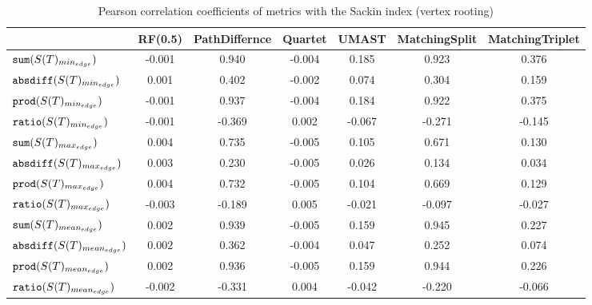 \begin{table}[h]
\centering
\caption{Pearson correlation coefficients of metrics with the Sackin index (vertex rooting)}
\begin{tabular}{lcccccc}
 & RF(0.5) & PathDiffernce & Quartet & UMAST & MatchingSplit & MatchingTriplet \\
\hline
${\verb+sum+}(S(T)_{min_{edge}})$ & -0.001 & 0.940 & -0.004 & 0.185 & 0.923 & 0.376 \\
${\verb+absdiff+}(S(T)_{min_{edge}})$ & 0.001 & 0.402 & -0.002 & 0.074 & 0.304 & 0.159 \\
${\verb+prod+}(S(T)_{min_{edge}})$ & -0.001 & 0.937 & -0.004 & 0.184 & 0.922 & 0.375 \\
${\verb+ratio+}(S(T)_{min_{edge}})$ & -0.001 & -0.369 & 0.002 & -0.067 & -0.271 & -0.145 \\
${\verb+sum+}(S(T)_{max_{edge}})$ & 0.004 & 0.735 & -0.005 & 0.105 & 0.671 & 0.130 \\
${\verb+absdiff+}(S(T)_{max_{edge}})$ & 0.003 & 0.230 & -0.005 & 0.026 & 0.134 & 0.034 \\
${\verb+prod+}(S(T)_{max_{edge}})$ & 0.004 & 0.732 & -0.005 & 0.104 & 0.669 & 0.129 \\
${\verb+ratio+}(S(T)_{max_{edge}})$ & -0.003 & -0.189 & 0.005 & -0.021 & -0.097 & -0.027 \\
${\verb+sum+}(S(T)_{mean_{edge}})$ & 0.002 & 0.939 & -0.005 & 0.159 & 0.945 & 0.227 \\
${\verb+absdiff+}(S(T)_{mean_{edge}})$ & 0.002 & 0.362 & -0.004 & 0.047 & 0.252 & 0.074 \\
${\verb+prod+}(S(T)_{mean_{edge}})$ & 0.002 & 0.936 & -0.005 & 0.159 & 0.944 & 0.226 \\
${\verb+ratio+}(S(T)_{mean_{edge}})$ & -0.002 & -0.331 & 0.004 & -0.042 & -0.220 & -0.066 \\
\end{tabular}
\end{table}

